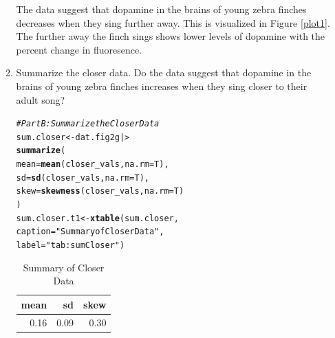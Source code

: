 \documentclass{article}\usepackage[]{graphicx}\usepackage[]{xcolor}
\makeatletter
\newcommand{\hlsng}[1]{\textcolor[rgb]{0.192,0.494,0.8}{#1}}%
\newcommand{\hlcom}[1]{\textcolor[rgb]{0.678,0.584,0.686}{\textit{#1}}}%
\newcommand{\hldef}[1]{\textcolor[rgb]{0.345,0.345,0.345}{#1}}%
\newcommand{\hlkwb}[1]{\textcolor[rgb]{0.69,0.353,0.396}{#1}}%
\newcommand{\hlkwc}[1]{\textcolor[rgb]{0.333,0.667,0.333}{#1}}%
\newcommand{\hlkwd}[1]{\textcolor[rgb]{0.737,0.353,0.396}{\textbf{#1}}}%
\newenvironment{kframe}{%
 \def\at@end@of@kframe{}%
 \ifinner\ifhmode%
  \def\at@end@of@kframe{\end{minipage}}%
  \begin{minipage}{\columnwidth}%
 \fi\fi%
 \def\FrameCommand##1{\hskip\@totalleftmargin \hskip-\fboxsep
 \colorbox{shadecolor}{##1}\hskip-\fboxsep
     \hskip-\linewidth \hskip-\@totalleftmargin \hskip\columnwidth}%
 \MakeFramed {\advance\hsize-\width
   \@totalleftmargin\z@ \linewidth\hsize
   \@setminipage}}%
 {\par\unskip\endMakeFramed%
 \at@end@of@kframe}
\newenvironment{knitrout}{}{} %
\makeatother
\begin{document}
\begin{enumerate}
\begin{enumerate}
The data suggest that dopamine in the brains of young zebra finches decreases when they sing further away. This is visualized in Figure \ref{plot1}. The further away the finch sings shows lower levels of dopamine with the percent change in fluoresence.
   \item Summarize the closer data. Do the data suggest that
   dopamine in the brains of young zebra finches increases when
   they sing closer to their adult song?
\begin{knitrout}
\color{fgcolor}\begin{kframe}
\begin{alltt}
\hlcom{# Part B: Summarize the Closer Data}
\hldef{sum.closer} \hlkwb{<-} \hldef{dat.fig2g |>}
  \hlkwd{summarize}\hldef{(}
    \hlkwc{mean} \hldef{=} \hlkwd{mean}\hldef{(closer_vals,} \hlkwc{na.rm} \hldef{= T),}
    \hlkwc{sd} \hldef{=} \hlkwd{sd}\hldef{(closer_vals,} \hlkwc{na.rm} \hldef{= T),}
    \hlkwc{skew} \hldef{=} \hlkwd{skewness}\hldef{(closer_vals,} \hlkwc{na.rm}\hldef{=T)}
  \hldef{)}
\hldef{sum.closer.t1} \hlkwb{<-} \hlkwd{xtable}\hldef{(sum.closer,}
                         \hlkwc{caption} \hldef{=} \hlsng{"Summary of Closer Data"}\hldef{,}
                         \hlkwc{label} \hldef{=} \hlsng{"tab:sumCloser"}\hldef{)}
\end{alltt}
\end{kframe}
\end{knitrout}
\begin{table}[H]
\centering
\begingroup\small
\begin{tabular}{rrr}
  \hline
mean & sd & skew \\ 
  \hline
0.16 & 0.09 & 0.30 \\ 
   \hline
\end{tabular}
\endgroup
\caption{Summary of Closer Data} 
\label{tab:sumCloser}
\end{table}


\end{enumerate}
\end{enumerate}
\end{document}
